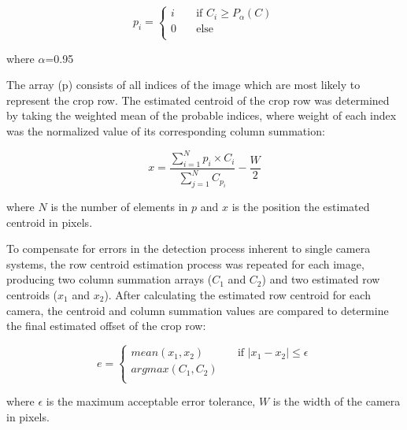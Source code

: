 \documentclass[authoryear]{elsarticle}
\begin{document}
\begin{equation}
  p_{i} =
  \begin{cases}
    i & \quad \text{if } C_{i} \geq P_{\alpha}(C) \\
    0 & \quad \text{else} \\
  \end{cases}
  \label{eq:p_threshold}
\end{equation}
\begin{flushleft}
where $\alpha$=0.95
\end{flushleft}

The array (p) consists of all indices of the image which are most
likely to represent the crop row. The estimated centroid of the crop
row was determined by taking the weighted mean of the probable
indices, where weight of each index was the normalized value of its
corresponding column summation:

\begin{equation}
    x = \frac{\displaystyle\sum_{i=1}^{N} p_{i} \times
      C_{i}}{\displaystyle\sum_{j=1}^{N} C_{p_{i}}} - \frac{W}{2}
  \label{eq:centroid}
\end{equation}
\begin{flushleft}
where $N$ is the number of elements in $p$ and $x$ is the position the
estimated centroid in pixels.
\end{flushleft}

To compensate for errors in the detection process inherent to single
camera systems, the row centroid estimation process was repeated for
each image, producing two column summation arrays ($C_{1}$ and $C_{2}$) and two
estimated row centroids ($x_{1}$ and $x_{2}$). After calculating the estimated
row centroid for each camera, the centroid and column summation values
are compared to determine the final estimated offset of the crop row:

\begin{equation}
  e = 
  \begin{cases}
    mean(x_{1},x_{2})  & \quad \text{if } |x_{1}-x_{2}| \leq  \epsilon\\
    argmax(C_{1},C_{2})  & \quad  \\
  \end{cases}
  \label{eq:camera_selection}
\end{equation}
\begin{flushleft}
where $\epsilon$ is the maximum acceptable error tolerance, $W$ is the width of
the camera in pixels. 
\end{flushleft}
\end{document}
